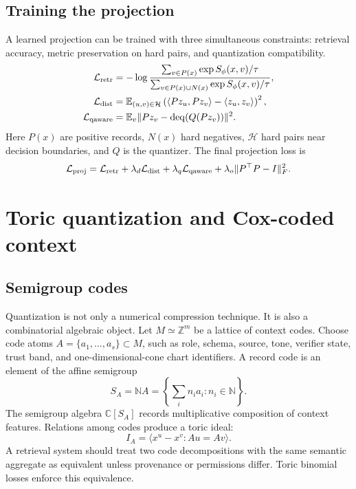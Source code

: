 \documentclass[11pt]{article}
\newcommand{\ZZ}{\mathbb{Z}}
\newcommand{\NN}{\mathbb{N}}
\newcommand{\CC}{\mathbb{C}}
\newcommand{\loss}{\mathcal{L}}
\numberwithin{equation}{section}
\begin{document}
\subsection{Training the projection}
A learned projection can be trained with three simultaneous constraints: retrieval accuracy, metric preservation on hard pairs, and quantization compatibility.
\begin{align}
\loss_{\rm retr}&=-\log\frac{\sum_{v\in P(x)}\exp S_\phi(x,v)/\tau}{\sum_{v\in P(x)\cup N(x)}\exp S_\phi(x,v)/\tau},\\
\loss_{\rm dist}&=\mathbb E_{(u,v)\in\mathcal{H}}\left(\langle Pz_u,Pz_v\rangle-\langle z_u,z_v\rangle\right)^2,\\
\loss_{\rm qaware}&=\mathbb E_v\|Pz_v-\operatorname{deq}(Q(Pz_v))\|^2.
\end{align}
Here $P(x)$ are positive records, $N(x)$ hard negatives, $\mathcal{H}$ hard pairs near decision boundaries, and $Q$ is the quantizer. The final projection loss is
\begin{equation}
\loss_{\rm proj}=\loss_{\rm retr}+\lambda_d\loss_{\rm dist}+\lambda_q\loss_{\rm qaware}+\lambda_o\|P^\top P-I\|_F^2.
\end{equation}

\section{Toric quantization and Cox-coded context}
\subsection{Semigroup codes}
Quantization is not only a numerical compression technique. It is also a combinatorial algebraic object. Let $M\simeq\ZZ^m$ be a lattice of context codes. Choose code atoms $A=\{a_1,\ldots,a_s\}\subset M$, such as role, schema, source, tone, verifier state, trust band, and one-dimensional-cone chart identifiers. A record code is an element of the affine semigroup
\begin{equation}
S_A=\NN A=\left\{\sum_i n_i a_i:n_i\in\NN\right\}.
\end{equation}
The semigroup algebra $\CC[S_A]$ records multiplicative composition of context features. Relations among codes produce a toric ideal:
\begin{equation}
I_A=\langle x^u-x^v: Au=Av\rangle.
\end{equation}
A retrieval system should treat two code decompositions with the same semantic aggregate as equivalent unless provenance or permissions differ. Toric binomial losses enforce this equivalence.
\end{document}
